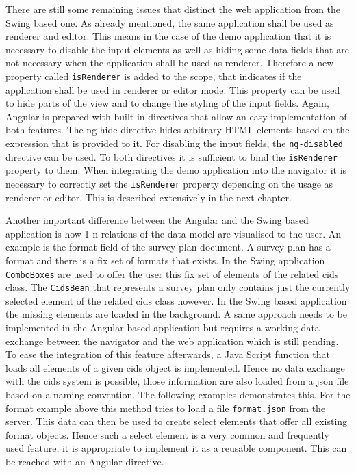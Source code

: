 There are still some remaining issues that distinct the web application from the Swing based one.
As already mentioned, the same application shall be used as renderer and editor.
This means in the case of the demo application that it is necessary to disable the input elements as well as hiding some data fields that are not necessary when the application shall be used as renderer.
Therefore a new property called \texttt{isRenderer} is added to the scope, that indicates if the application shall be used in renderer or editor mode.
This property can be used to hide parts of the view and to change the styling of the input fields.
Again, Angular is prepared with built in directives that allow an easy implementation of both features.
The ng-hide  directive hides arbitrary HTML elements based on the expression that is provided to it.
For disabling the input fields, the \texttt{ng-disabled} directive can be used.
To both directives it is sufficient to bind the \texttt{isRenderer} property to them.
When integrating the demo application into the navigator it is necessary to correctly set the \texttt{isRenderer} property depending on the usage as renderer or editor.
This is described extensively in the next chapter.

Another important difference between the Angular and the Swing based application is how 1-n relations of the data model are visualised to the user.
An example is the format field of the survey plan document. A survey plan has a format and there is a fix set of formats that exists. 
In the Swing application \texttt{ComboBoxes} are used to offer the user this fix set of elements of the related cids class.
The \texttt{CidsBean} that represents a survey plan only contains just the currently selected element of the related cids class however.  
In the Swing based application the missing elements are loaded in the background.
A same approach needs to be implemented in the Angular based application but requires a working data exchange between the navigator and the web application which is still pending.
To ease the integration of this feature afterwards, a Java Script  function that loads all elements of a given cids object is implemented.
Hence no data exchange with the cids system is possible, those information are also loaded from a json  file based on a naming convention.
The following examples demonstrates this.
For the format example above this method tries to load a file \texttt{format.json} from the server.
This data can then be used to create select elements that offer all existing format objects.
Hence such a select element is a very common and frequently used feature, it is appropriate to implement it as a reusable component.
This can be reached with an Angular directive.

